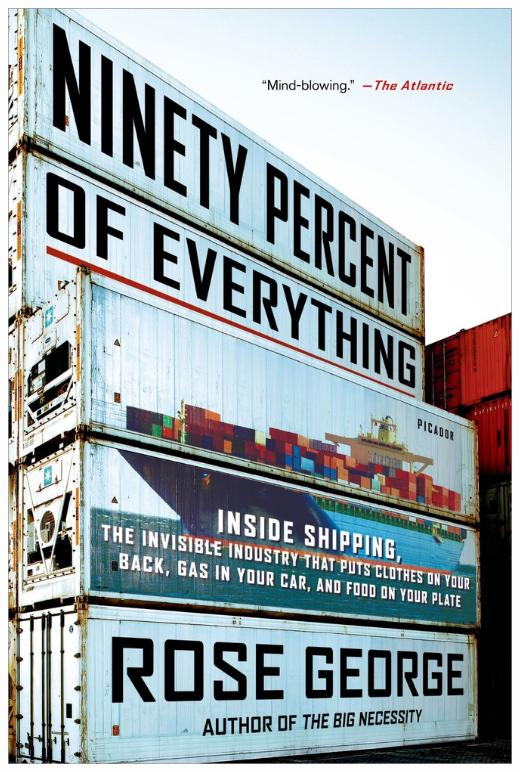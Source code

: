 \documentclass{tufte-handout}
\makeatletter
\newcommand{\varcaption}[2][0pt]{%
  \gsetlength{\@tufte@caption@vertical@offset}{-#1}%
  \gdef\@tufte@stored@varcaption{#2}%
}
\gdef\@tufte@stored@varcaption{} %
\makeatother
\begin{document}
\begin{marginfigure}[-43\baselineskip]
   \includegraphics[width=\linewidth]{images/ninety_percent_of_everything.jpg}
   \varcaption{\href{https://us.macmillan.com/books/9781250058294}{Publisher Link}, \href{https://www.amazon.com/Ninety-Percent-Everything-Shipping-Invisible/dp/1250058295/}{Amazon Link}}
\end{marginfigure}
\end{document}
